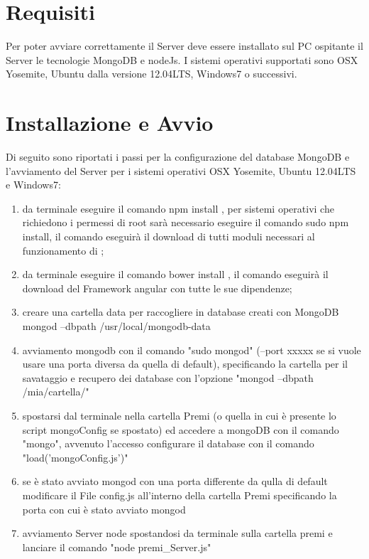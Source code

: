 \section{Requisiti}
Per poter avviare correttamente il Server deve essere installato sul PC ospitante il Server le tecnologie MongoDB e nodeJs. I sistemi operativi supportati sono OSX Yosemite, Ubuntu dalla versione 12.04LTS, Windows7 o successivi.

\section{Installazione e Avvio}

Di seguito sono riportati i passi per la configurazione del database MongoDB e l'avviamento del Server per i sistemi operativi OSX Yosemite, Ubuntu  12.04LTS e Windows7:

\begin{enumerate}
\item da terminale eseguire il comando npm install , per sistemi operativi che richiedono i permessi di root sarà necessario eseguire il comando sudo npm install, il comando eseguirà il download di tutti moduli necessari al funzionamento di \premi;
\item da terminale eseguire il comando bower install , il comando eseguirà il download del Framework angular con tutte le sue dipendenze;
\item creare una cartella data per raccogliere in database creati con MongoDB
mongod --dbpath /usr/local/mongodb-data
\item avviamento mongodb con il comando "sudo mongod" (--port xxxxx se si vuole usare una porta diversa da quella di default), specificando la cartella per il savataggio e recupero dei database con l'opzione "mongod --dbpath /mia/cartella/"
\item  spostarsi dal terminale nella cartella Premi (o quella in cui \`{e} presente lo script mongoConfig se spostato) ed accedere a mongoDB con il comando "mongo", avvenuto l'accesso configurare il database con il comando "load('mongoConfig.js')"
\item se \`{e} stato avviato mongod con una porta differente da qulla di default modificare il File config.js all'interno della cartella Premi specificando la porta con cui \`{e} stato avviato mongod
\item  avviamento Server node spostandosi da terminale sulla cartella premi e lanciare il comando "node premi\_Server.js" %

\end{enumerate}
